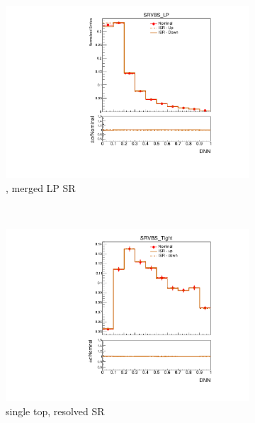 \begin{figure}[p]
\begin{subfigure}[b]{0.3\textwidth}
        \includegraphics[width=\textwidth]{figures/1lep/PDFUnc/ISR/ttbar_0ptag1pfat0pjet_0ptv_SRVBS_LP_DNN_SysTheoryISR_ttbar__1up_Norm.pdf}
        \caption{\ttbar, merged LP SR}
    \end{subfigure}
    \\
    \vspace{5mm}
    \begin{subfigure}[b]{0.3\textwidth}
        \includegraphics[width=\textwidth]{figures/1lep/PDFUnc/ISR/stop_0ptag2pjet_0ptv_SRVBS_Tight_DNN_SysTheoryISR_stop__1up_Norm.pdf}
        \caption{single top, resolved SR}
    \end{subfigure}
    \begin{subfigure}[b]{0.3\textwidth}

\end{subfigure}
\end{figure}
